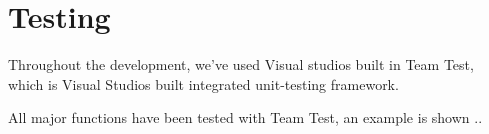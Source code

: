 \chapter{Testing}
\label{chap:testing}

Throughout the development, we've used Visual studios built in Team Test, which is Visual Studios built integrated unit-testing framework. \cite{teamtest}

All major functions have been tested with Team Test, an example is shown ..

